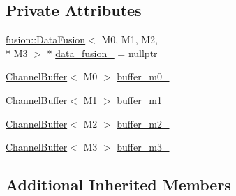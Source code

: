 \subsection*{Private Attributes}
\begin{DoxyCompactItemize}
\item 
\hyperlink{classapollo_1_1cyber_1_1data_1_1fusion_1_1DataFusion}{fusion\-::\-Data\-Fusion}$<$ M0, M1, M2, \\*
M3 $>$ $\ast$ \hyperlink{classapollo_1_1cyber_1_1data_1_1DataVisitor_a514ffc2170635b2cd8bf017fbe54f2ab}{data\-\_\-fusion\-\_\-} = nullptr
\item 
\hyperlink{classapollo_1_1cyber_1_1data_1_1ChannelBuffer}{Channel\-Buffer}$<$ M0 $>$ \hyperlink{classapollo_1_1cyber_1_1data_1_1DataVisitor_aadc37e90886bb1a67db1aacc04886d72}{buffer\-\_\-m0\-\_\-}
\item 
\hyperlink{classapollo_1_1cyber_1_1data_1_1ChannelBuffer}{Channel\-Buffer}$<$ M1 $>$ \hyperlink{classapollo_1_1cyber_1_1data_1_1DataVisitor_afd0449bddcb881e18ae46658d3ddb0a9}{buffer\-\_\-m1\-\_\-}
\item 
\hyperlink{classapollo_1_1cyber_1_1data_1_1ChannelBuffer}{Channel\-Buffer}$<$ M2 $>$ \hyperlink{classapollo_1_1cyber_1_1data_1_1DataVisitor_a2dc3d9334f9518e65a9819c63bf5fa63}{buffer\-\_\-m2\-\_\-}
\item 
\hyperlink{classapollo_1_1cyber_1_1data_1_1ChannelBuffer}{Channel\-Buffer}$<$ M3 $>$ \hyperlink{classapollo_1_1cyber_1_1data_1_1DataVisitor_af59b0b1507bb1230495202a03ece6f14}{buffer\-\_\-m3\-\_\-}
\end{DoxyCompactItemize}
\subsection*{Additional Inherited Members}


